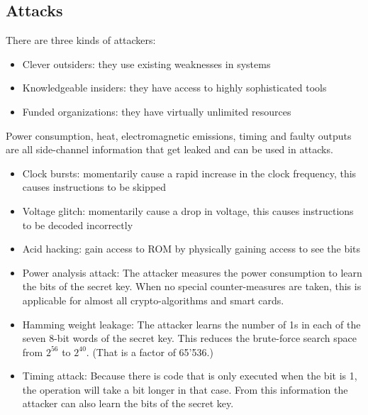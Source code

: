 \subsection{Attacks}
\begin{mytitle} There are three kinds of attackers:
\begin{itemize}
    \item Clever outsiders: they use existing weaknesses in systems
    \item Knowledgeable insiders: they have access to highly sophisticated tools
    \item Funded organizations: they have virtually unlimited resources
\end{itemize}
\end{mytitle}
\begin{mytitle}[Leakage] Power consumption, heat, electromagnetic emissions, timing and faulty outputs are all side-channel information that get leaked and can be used in attacks.
\end{mytitle}
\begin{mytitle}\hfill
\begin{itemize}
    \item Clock bursts: momentarily cause a rapid increase in the clock frequency, this causes instructions to be skipped
    \item Voltage glitch: momentarily cause a drop in voltage, this causes instructions to be decoded incorrectly
    \item Acid hacking: gain access to ROM by physically gaining access to see the bits
\end{itemize}
\end{mytitle}
\begin{mytitle}\hfill
\begin{itemize}
    \item Power analysis attack: The attacker measures the power consumption to learn the bits of the secret key. When no special counter-measures are taken, this is applicable for almost all crypto-algorithms and smart cards.
    \item Hamming weight leakage: The attacker learns the number of 1s in each of the seven 8-bit words of the secret key. This reduces the brute-force search space from $2^{56}$ to $2^{40}$. (That is a factor of 65'536.)
    \item Timing attack: Because there is code that is only executed when the bit is 1, the operation will take a bit longer in that case. From this information the attacker can also learn the bits of the secret key.
\end{itemize}
\end{mytitle}

